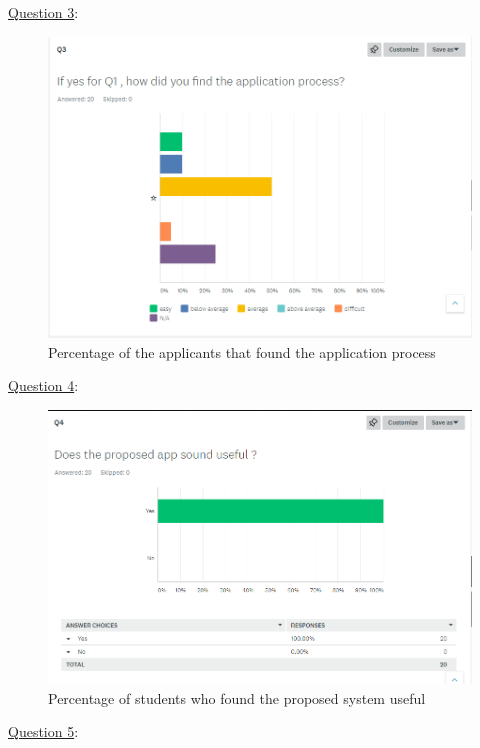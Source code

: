 \documentclass[a4paper, 12pt]{article}
\begin{document}
\newpage
\underline{Question 3}:

\begin{figure}[h]
\centering
\includegraphics[scale=0.6]{Q3}
\caption{Percentage of the applicants that found the application process}
\label{fig:2}
\end{figure}

\newpage
\underline{Question 4}:

\begin{figure}[h]
\centering
\includegraphics[scale=0.6]{Q4}
\caption{Percentage of students who found the proposed system useful}
\label{fig:3}
\end{figure}

\newpage
\underline{Question 5}:
\end{document}
